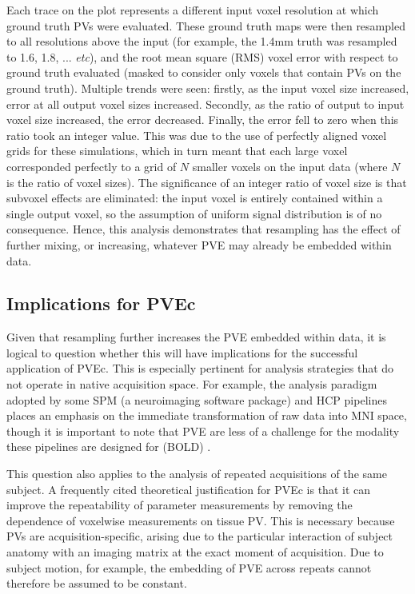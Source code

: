 Each trace on the plot represents a different input voxel resolution at which ground truth PVs were evaluated. These ground truth maps were then resampled to all resolutions above the input (for example, the 1.4mm truth was resampled to 1.6, 1.8, ... \textit{etc}), and the root mean square (RMS) voxel error with respect to ground truth evaluated (masked to consider only voxels that contain PVs on the ground truth). Multiple trends were seen: firstly, as the input voxel size increased, error at all output voxel sizes increased. Secondly, as the ratio of output to input voxel size increased, the error decreased. Finally, the error fell to zero when this ratio took an integer value. This was due to the use of perfectly aligned voxel grids for these simulations, which in turn meant that each large voxel corresponded perfectly to a grid of $N$ smaller voxels on the input data (where $N$ is the ratio of voxel sizes). The significance of an integer ratio of voxel size is that subvoxel effects are eliminated: the input voxel is entirely contained within a single output voxel, so the assumption of uniform signal distribution is of no consequence. Hence, this analysis demonstrates that resampling has the effect of further mixing, or increasing, whatever PVE may already be embedded within data. 


\subsection{Implications for PVEc} 

Given that resampling further increases the PVE embedded within data, it is logical to question whether this will have implications for the successful application of PVEc. This is especially pertinent for analysis strategies that do not operate in native acquisition space. For example, the analysis paradigm adopted by some SPM (a neuroimaging software package) and HCP pipelines places an emphasis on the immediate transformation of raw data into MNI space, though it is important to note that PVE are less of a challenge for the modality these pipelines are designed for (BOLD) \cite{Glasser2013, Friston2003a}. 

This question also applies to the analysis of repeated acquisitions of the same subject. A frequently cited theoretical justification for PVEc is that it can improve the repeatability of parameter measurements by removing the dependence of voxelwise measurements on tissue PV. This is necessary because PVs are acquisition-specific, arising due to the particular interaction of subject anatomy with an imaging matrix at the exact moment of acquisition. Due to subject motion, for example, the embedding of PVE across repeats cannot therefore be assumed to be constant. 

